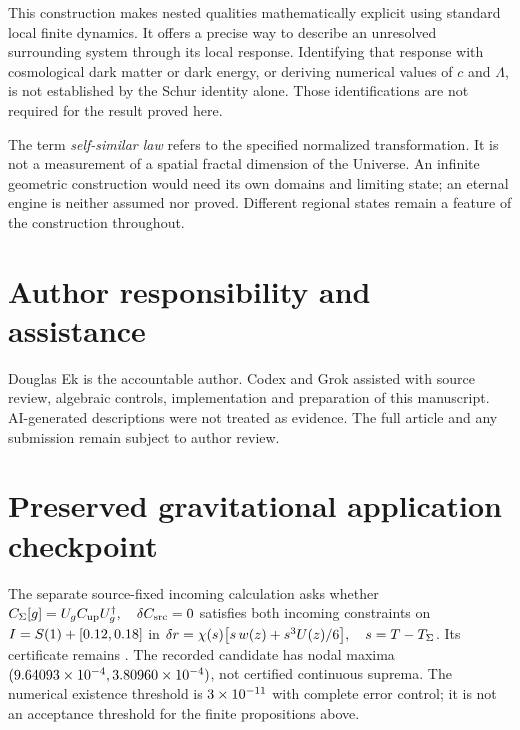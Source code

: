 \documentclass[11pt]{article}
\begin{document}
This construction makes nested qualities mathematically explicit using
standard local finite dynamics. It offers a precise way to describe an
unresolved surrounding system through its local response. Identifying that
response with cosmological dark matter or dark energy, or deriving numerical
values of $c$ and $\Lambda$, is not established by the Schur identity alone.
Those identifications are not required for the result proved here.

The term \emph{self-similar law} refers to the specified normalized
transformation. It is not a measurement of a spatial fractal dimension of
the Universe. An infinite geometric construction would need its own domains
and limiting state; an eternal engine is neither assumed nor proved.
Different regional states remain a feature of the construction throughout.

\section*{Author responsibility and assistance}
Douglas Ek is the accountable author. Codex and Grok assisted with source
review, algebraic controls, implementation and preparation of this manuscript.
AI-generated descriptions were not treated as evidence. The full article and
any submission remain subject to author review.

\appendix
\section{Preserved gravitational application checkpoint}\label{app:gate}
The separate source-fixed incoming calculation asks whether
$C_{\Sigma}[g]=U_{g}C_{\mathrm{up}}U_{g}^{\dagger},\quad \delta C_{\mathrm{src}}=0$ satisfies both incoming constraints on $I=S(1)+[0.12,0.18]$ in
$\delta r=\chi(s)\bigl[s\,w(z)+s^{3}U(z)/6\bigr],\quad s=T-T_{\Sigma}$. Its certificate remains \textbf{\NSCVerdict}.
The recorded candidate has nodal maxima
$(9.64093\times10^{-4},3.80960\times10^{-4})$, not certified continuous suprema.
The numerical existence threshold is $3\times 10^{-11}$ with complete error
control; it is not an acceptance threshold for the finite propositions above.
\end{document}
